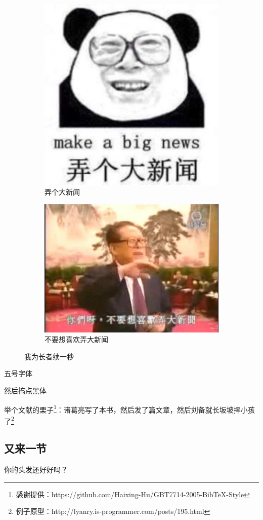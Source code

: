 \begin{figure}[H]
	\centering
	\begin{subfigure}[b]{0.3\textwidth}
		\centering
		\includegraphics[width=.15\textheight]{images/make_a_big_news.jpg}
		\caption{弄个大新闻}
	\end{subfigure}
	\begin{subfigure}[b]{0.3\textwidth}
		\centering
		\includegraphics[width=.15\textheight]{images/you_like_big_news.jpg}
		\caption{不要想喜欢弄大新闻}
	\end{subfigure}
	\caption{我为长者续一秒}
\end{figure}

{\wuhao 五号字体}

{ 然后搞点黑体}

举个文献的栗子\footnote{感谢提供：https://github.com/Haixing-Hu/GBT7714-2005-BibTeX-Style}：诸葛亮写了本书\cite{诸葛亮:Book}，然后发了篇文章\cite{诸葛亮:Article}，然后刘备就长坂坡摔小孩了\cite{刘备:摔小孩}\footnote{例子原型：http://lyanry.is-programmer.com/posts/195.html}

\subsection{又来一节}
你的头发还好好吗？
